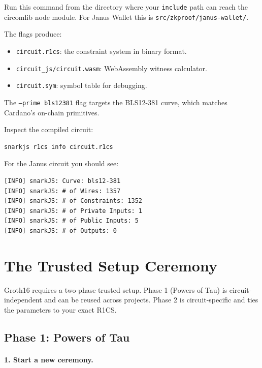 \begin{remark}
Run this command from the directory where your \texttt{include} path can reach the circomlib node module. For Janus Wallet this is \texttt{src/zkproof/janus-wallet/}.
\end{remark}

The flags produce:

\begin{itemize}
  \item \texttt{circuit.r1cs}: the constraint system in binary format.
  \item \texttt{circuit\_js/circuit.wasm}: WebAssembly witness calculator.
  \item \texttt{circuit.sym}: symbol table for debugging.
\end{itemize}

The \texttt{--prime bls12381} flag targets the BLS12-381 curve, which matches Cardano's on-chain primitives.

Inspect the compiled circuit:

\begin{verbatim}
snarkjs r1cs info circuit.r1cs
\end{verbatim}

For the Janus circuit you should see:

\begin{verbatim}
[INFO] snarkJS: Curve: bls12-381
[INFO] snarkJS: # of Wires: 1357
[INFO] snarkJS: # of Constraints: 1352
[INFO] snarkJS: # of Private Inputs: 1
[INFO] snarkJS: # of Public Inputs: 5
[INFO] snarkJS: # of Outputs: 0
\end{verbatim}

\section{The Trusted Setup Ceremony} \label{sec:trusted-setup}

Groth16 requires a two-phase trusted setup. Phase 1 (Powers of Tau) is circuit-independent and can be reused across projects. Phase 2 is circuit-specific and ties the parameters to your exact R1CS.

\subsection*{Phase 1: Powers of Tau}

\paragraph{1. Start a new ceremony.}

